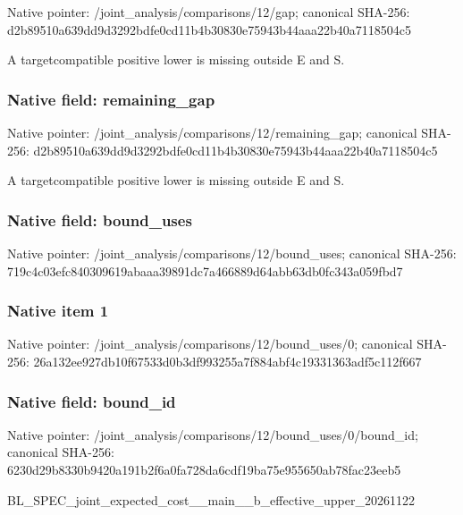 \documentclass[10pt,a4paper]{article}
\begin{document}
Native pointer: /joint\_analysis/comparisons/12/gap; canonical SHA-256: d2b89510a639dd9d3292bdfe\allowbreak{}0cd11b4b30830e75943b44aa\allowbreak{}a22b40a7118504c5


A targetcompatible positive lower is missing outside E and S.


\subsubsection{Native field: remaining\_gap}


Native pointer: /joint\_analysis/comparis\allowbreak{}ons/12/remaining\_gap; canonical SHA-256: d2b89510a639dd9d3292bdfe\allowbreak{}0cd11b4b30830e75943b44aa\allowbreak{}a22b40a7118504c5


A targetcompatible positive lower is missing outside E and S.


\subsubsection{Native field: bound\_uses}


Native pointer: /joint\_analysis/comparis\allowbreak{}ons/12/bound\_uses; canonical SHA-256: 719c4c03efc840309619abaa\allowbreak{}a39891dc7a466889d64abb63\allowbreak{}db0fc343a059fbd7



\subsubsection{Native item 1}


Native pointer: /joint\_analysis/comparis\allowbreak{}ons/12/bound\_uses/0; canonical SHA-256: 26a132ee927db10f67533d0b\allowbreak{}3df993255a7f884abf4c1933\allowbreak{}1363adf5c112f667



\subsubsection{Native field: bound\_id}


Native pointer: /joint\_analysis/comparis\allowbreak{}ons/12/bound\_uses/0/boun\allowbreak{}d\_id; canonical SHA-256: 6230d29b8330b9420a191b2f\allowbreak{}6a0fa728da6cdf19ba75e955\allowbreak{}650ab78fac23eeb5


BL\_SPEC\_joint\_expected\_c\allowbreak{}ost\_\_main\_\_b\_effective\_u\allowbreak{}pper\_20261122
\end{document}

